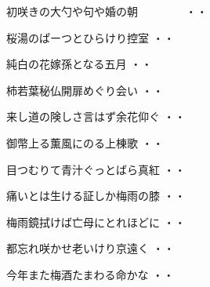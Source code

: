 \begin{shiika}初咲きの大勺や句や婚の朝　　　　
\hfill{・・}\end{shiika}
\vspace{0.6cm}
\begin{shiika}桜湯のぱーつとひらけり控室
\hfill{・・}\end{shiika}
\vspace{0.6cm}
\begin{shiika}純白の花嫁孫となる五月
\hfill{・・}\end{shiika}
\vspace{0.6cm}
\begin{shiika}柿若葉秘仏開扉めぐり会い
\hfill{・・}\end{shiika}
\vspace{0.6cm}
\begin{shiika}来し道の険しさ言はず余花仰ぐ
\hfill{・・}\end{shiika}
\vspace{0.6cm}
\begin{shiika}御幣上る薫風にのる上棟歌
\hfill{・・}\end{shiika}
\vspace{0.6cm}
\begin{shiika}目つむりて青汁ぐっとばら真紅
\hfill{・・}\end{shiika}
\vspace{0.6cm}
\begin{shiika}痛いとは生ける証しか梅雨の膝
\hfill{・・}\end{shiika}
\vspace{0.6cm}
\begin{shiika}梅雨鏡拭けば亡母にとれほどに
\hfill{・・}\end{shiika}
\vspace{0.6cm}
\begin{shiika}都忘れ咲かせ老いけり京遠く
\hfill{・・}\end{shiika}
\vspace{0.6cm}
\begin{shiika}今年また梅酒たまわる命かな
\hfill{・・}\end{shiika}
\vspace{0.6cm}
